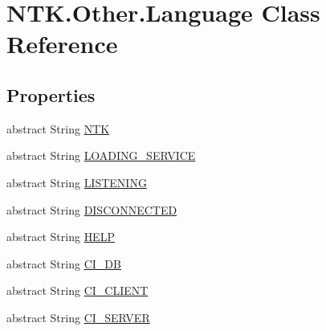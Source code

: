\hypertarget{class_n_t_k_1_1_other_1_1_language}{}\section{N\+T\+K.\+Other.\+Language Class Reference}
\label{class_n_t_k_1_1_other_1_1_language}
\subsection*{Properties}
\begin{DoxyCompactItemize}
\item 
abstract String \mbox{\hyperlink{class_n_t_k_1_1_other_1_1_language_a33bdd269554bd5fb6229cd4917a8a8ac}{N\+TK}}
\item 
abstract String \mbox{\hyperlink{class_n_t_k_1_1_other_1_1_language_ae860d8219dbcdb35ec2e5d08730c08c2}{L\+O\+A\+D\+I\+N\+G\+\_\+\+S\+E\+R\+V\+I\+CE}}
\item 
abstract String \mbox{\hyperlink{class_n_t_k_1_1_other_1_1_language_ad60449307582250eb897c8125890239c}{L\+I\+S\+T\+E\+N\+I\+NG}}
\item 
abstract String \mbox{\hyperlink{class_n_t_k_1_1_other_1_1_language_a5844164b80d6f9b0db33245f1d141650}{D\+I\+S\+C\+O\+N\+N\+E\+C\+T\+ED}}
\item 
abstract String \mbox{\hyperlink{class_n_t_k_1_1_other_1_1_language_acb35ae00b0891693df1acdf224951a4e}{H\+E\+LP}}
\item 
abstract String \mbox{\hyperlink{class_n_t_k_1_1_other_1_1_language_a97317eb77cd883962096758b1d2cce30}{C\+I\+\_\+\+DB}}
\item 
abstract String \mbox{\hyperlink{class_n_t_k_1_1_other_1_1_language_a8d5ec7488aa39750111514ac2d912c26}{C\+I\+\_\+\+C\+L\+I\+E\+NT}}
\item 
abstract String \mbox{\hyperlink{class_n_t_k_1_1_other_1_1_language_a5e0b5cbd4c7d8e78cbf17c02596744be}{C\+I\+\_\+\+S\+E\+R\+V\+ER}}

\end{DoxyCompactItemize}
